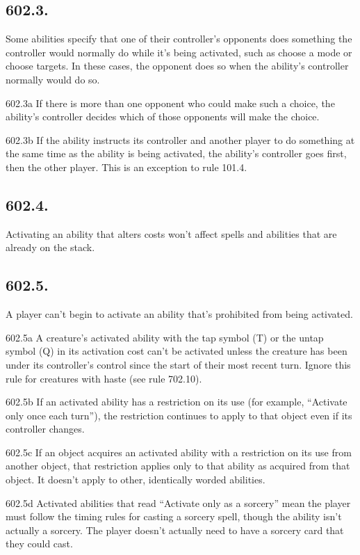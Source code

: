 \subsection*{602.3.}
Some abilities specify that one of their controller’s opponents does something the controller would normally do while it’s being activated, such as choose a mode or choose targets. In these cases, the opponent does so when the ability’s controller normally would do so.

602.3a If there is more than one opponent who could make such a choice, the ability’s controller decides which of those opponents will make the choice.

602.3b If the ability instructs its controller and another player to do something at the same time as the ability is being activated, the ability’s controller goes first, then the other player. This is an exception to rule 101.4.

\subsection*{602.4.}
Activating an ability that alters costs won’t affect spells and abilities that are already on the stack.

\subsection*{602.5.}
A player can’t begin to activate an ability that’s prohibited from being activated.

602.5a A creature’s activated ability with the tap symbol ({T}) or the untap symbol ({Q}) in its activation cost can’t be activated unless the creature has been under its controller’s control since the start of their most recent turn. Ignore this rule for creatures with haste (see rule 702.10).

602.5b If an activated ability has a restriction on its use (for example, “Activate only once each turn”), the restriction continues to apply to that object even if its controller changes.

602.5c If an object acquires an activated ability with a restriction on its use from another object, that restriction applies only to that ability as acquired from that object. It doesn’t apply to other, identically worded abilities.

602.5d Activated abilities that read “Activate only as a sorcery” mean the player must follow the timing rules for casting a sorcery spell, though the ability isn’t actually a sorcery. The player doesn’t actually need to have a sorcery card that they could cast.

